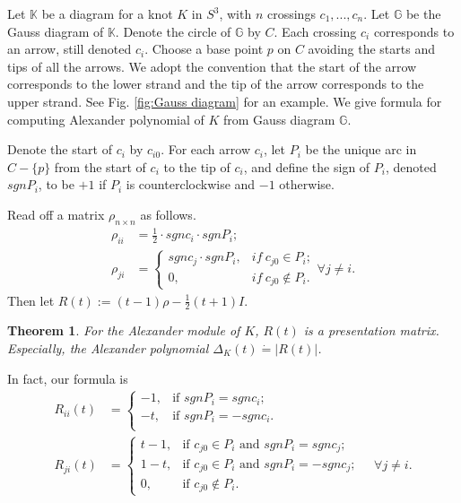 \documentclass{amsart}
\newtheorem{thm}{Theorem}[subsection]
\theoremstyle{definition}
\theoremstyle{remark}
\numberwithin{equation}{subsection}
\begin{document}
Let $\mathbb{K}$ be a diagram for a knot $K$ in $S^{3}$, with $n$ crossings $c_{1},...,c_{n}$. Let $\mathbb{G}$ be the Gauss diagram of $\mathbb{K}$. Denote the circle of $\mathbb{G}$ by $C$. Each crossing $c_{i}$ corresponds to an arrow, still denoted $c_{i}$. Choose a base point $p$ on $C$ avoiding the starts and tips of all the arrows. We adopt the convention that the start of the arrow corresponds to the lower strand and the tip of the arrow corresponds to the upper strand. See Fig. \ref{fig:Gauss diagram} for an example. We give formula for computing Alexander polynomial of $K$ from Gauss diagram $\mathbb{G}$. 

Denote the start of $c_{i}$ by $c_{i0}$. For each arrow $c_{i}$, let $P_{i}$ be the unique arc in $C-\{p\}$ from the start of $c_{i}$ to the tip of $c_{i}$, and define the sign of $P_{i}$, denoted $sgnP_{i}$, to be $+1$ if $P_{i}$ is counterclockwise and $-1$ otherwise.

Read off a matrix $\rho_{n\times n}$ as follows.
\begin{align}
    \rho_{ii}  &   = \frac{1}{2}\cdot sgnc_{i}\cdot sgnP_{i}; \nonumber\\ 
    \rho_{ji} & = \begin{cases}
                      sgnc_{j}\cdot sgnP_{i},&if~c_{j0}\in P_{i};\\
                       0,     &if~c_{j0}\notin P_{i}.
                   \end{cases}\forall j\neq i.
\end{align}
Then let $ R(t):=(t-1)\rho-\frac{1}{2}(t+1)I $.

\begin{thm}\label{thm:classical}
For the Alexander module of $K$, $R(t)$ is a presentation matrix.
Especially, the Alexander polynomial $\Delta_K (t)\dot{=} |R(t)|$.
\end{thm}

In fact, our formula is
\begin{align}
R_{ii}(t) &= \begin{cases}
-1, & \text{if } sgnP_{i} = sgnc_{i}; \\
-t, & \text{if } sgnP_{i} = -sgnc_{i}.\\ \nonumber
\end{cases}\\
R_{ji}(t) &= \begin{cases}
t-1, & \text{if } c_{j0} \in P_{i} \text{ and } sgnP_{i} = sgnc_{j}; \\
1-t, & \text{if } c_{j0} \in P_{i} \text{ and } sgnP_{i} = -sgnc_{j}; \\
0, & \text{if } c_{j0} \notin P_{i}.
\end{cases} \quad \forall j \neq i. \label{for:R(t) classicla knots}
\end{align}
\end{document}
